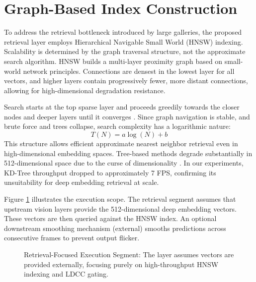 \documentclass[conference]{IEEEtran}
\begin{document}
\section{Graph-Based Index Construction}

To address the retrieval bottleneck introduced by large galleries, the proposed retrieval layer employs Hierarchical Navigable Small World (HNSW) indexing. Scalability is determined by the graph traversal structure, not the approximate search algorithm. HNSW builds a multi-layer proximity graph based on small-world network principles. Connections are densest in the lowest layer for all vectors, and higher layers contain progressively fewer, more distant connections, allowing for high-dimensional degradation resistance.

Search starts at the top sparse layer and proceeds greedily towards the closer nodes and deeper layers until it converges \cite{b7}. Since graph navigation is stable, and brute force and trees collapse, search complexity has a logarithmic nature:
\begin{equation}
T(N) = a \log(N) + b
\end{equation}
This structure allows efficient approximate nearest neighbor retrieval even in high-dimensional embedding spaces. Tree-based methods degrade substantially in 512-dimensional space due to the curse of dimensionality \cite{b12}. In our experiments, KD-Tree throughput dropped to approximately 7 FPS, confirming its unsuitability for deep embedding retrieval at scale.

Figure \ref{fig:arch} illustrates the execution scope. The retrieval segment assumes that upstream vision layers provide the 512-dimensional deep embedding vectors. These vectors are then queried against the HNSW index. An optional downstream smoothing mechanism (external) smooths predictions across consecutive frames to prevent output flicker.

\begin{figure}[htbp]
\centering
{}
\caption{Retrieval-Focused Execution Segment: The layer assumes vectors are provided externally, focusing purely on high-throughput HNSW indexing and LDCC gating.}
\label{fig:arch}
\end{figure}
\end{document}
